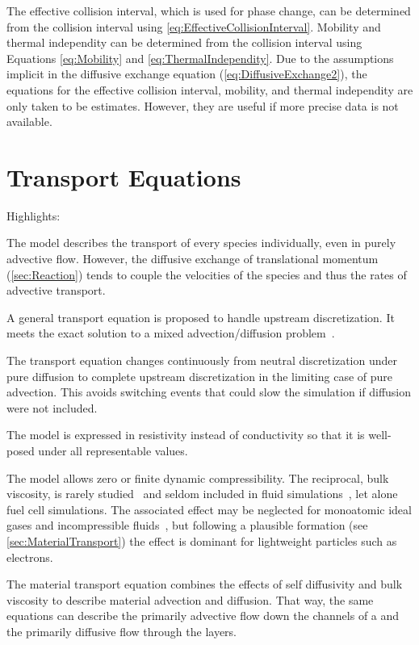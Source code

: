 The effective collision interval, which is used for phase change, can be determined from the collision interval using \autoref{eq:EffectiveCollisionInterval}.  Mobility and thermal independity can be determined from the collision interval using Equations \ref{eq:Mobility} and \ref{eq:ThermalIndependity}.  Due to the assumptions implicit in the diffusive exchange equation (\ref{eq:DiffusiveExchange2}), the equations for the effective collision interval, mobility, and thermal independity are only taken to be estimates.  However, they are useful if more precise data is not available.


\section{Transport Equations}
\label{sec:Transport}


\begin{contextbox}
  Highlights:
  \begin{itemize*}
    \item The model describes the transport of every species individually, even in purely advective flow.  However, the diffusive exchange of translational momentum (\autoref{sec:Reaction}) tends to couple the velocities of the species and thus the rates of advective transport.
    \item A general transport equation is proposed to handle upstream discretization.  It meets the exact solution to a mixed advection\slash{}diffusion problem~\cite{Patankar1980}.
    \item The transport equation changes continuously from neutral discretization under pure diffusion to complete upstream discretization in the limiting case of pure advection.  This avoids switching events that could slow the simulation if diffusion were not included.
    \item The model is expressed in resistivity instead of conductivity so that it is well-posed under all representable values.
    \item The model allows zero or finite dynamic compressibility.  The reciprocal, bulk viscosity, is rarely studied~\cite{Rah1999} and seldom included in fluid simulations~\cite{Meier2005}, let alone fuel cell simulations.  The associated effect may be neglected for monoatomic ideal gases and incompressible fluids~\cite{Kerkhof2005ChemEngSci, Meier2005}, but following a plausible formation (see \autoref{sec:MaterialTransport}) the effect is dominant for lightweight particles such as electrons.
    \item The material transport equation combines the effects of self diffusivity and bulk viscosity to describe material advection and diffusion.  That way, the same equations can describe the primarily advective flow down the channels of a  and the primarily diffusive flow through the layers.
  \end{itemize*}
\end{contextbox}

